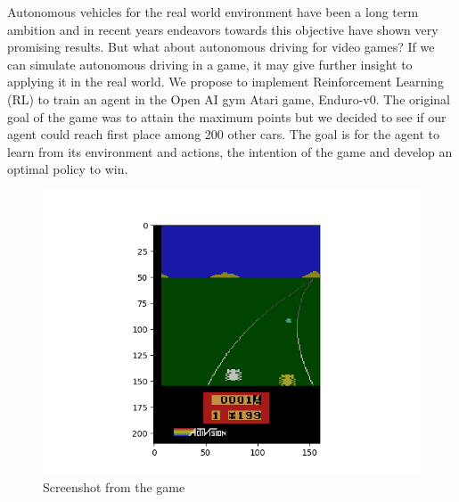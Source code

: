 \documentclass[10pt,twocolumn,letterpaper]{article}
\begin{document}
Autonomous vehicles for the real world environment have been a long term ambition and in recent years endeavors towards this objective have shown very promising results. But what about autonomous driving for video games? If we can simulate autonomous driving in a game, it may give further insight to applying it in the real world. We propose to implement Reinforcement Learning (RL) to train an agent in the Open AI gym Atari game, Enduro-v0. The original goal of the game was to attain the maximum points but we decided to see if our agent could reach first place among 200 other cars. The goal is for the agent to learn from its environment and actions, the intention of the game and develop an optimal policy to win.
\begin{figure}[h]
\centering
\includegraphics[width=0.8\linewidth]{img81.png}
\caption{Screenshot from the game}
\end{figure}

\end{document}
